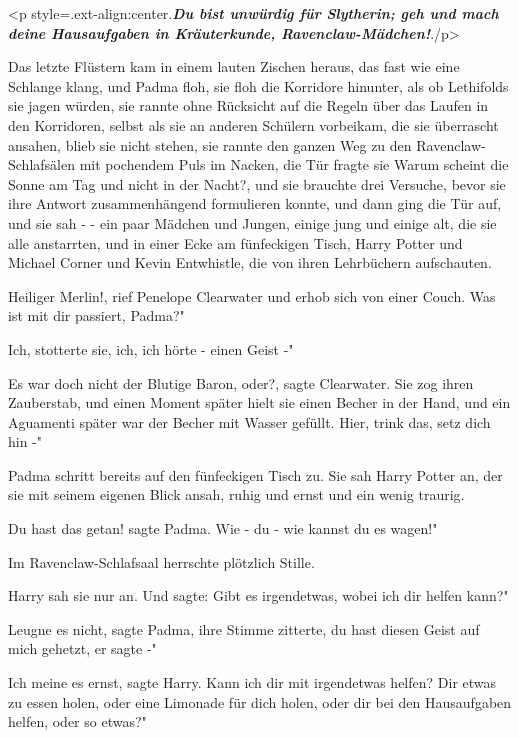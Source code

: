 <p style=\grqq{}.ext-align:center\grqq{}.\textbf{\emph{Du bist unwürdig für
Slytherin; geh und mach deine Hausaufgaben in Kräuterkunde,
Ravenclaw-Mädchen!}}\grqq{}./p>

Das letzte Flüstern kam in einem lauten Zischen heraus, das fast wie eine
Schlange klang, und Padma floh, sie floh die Korridore hinunter, als ob
Lethifolds sie jagen würden, sie rannte ohne Rücksicht auf die Regeln über das
Laufen in den Korridoren, selbst als sie an anderen Schülern vorbeikam, die sie
überrascht ansahen, blieb sie nicht stehen, sie rannte den ganzen Weg zu den
Ravenclaw-Schlafsälen mit pochendem Puls im Nacken, die Tür fragte sie \glqq
Warum scheint die Sonne am Tag und nicht in der Nacht?\grqq{}, und sie brauchte
drei Versuche, bevor sie ihre Antwort zusammenhängend formulieren konnte, und
dann ging die Tür auf, und sie sah - - ein paar Mädchen und Jungen, einige jung
und einige alt, die sie alle anstarrten, und in einer Ecke am fünfeckigen Tisch,
Harry Potter und Michael Corner und Kevin Entwhistle, die von ihren Lehrbüchern
aufschauten.

\glqq Heiliger Merlin!\grqq{}, rief Penelope Clearwater und erhob sich von einer
Couch. \glqq Was ist mit dir passiert, Padma?"

\glqq Ich\grqq{}, stotterte sie, \glqq ich, ich hörte - einen Geist -"

\glqq Es war doch nicht der Blutige Baron, oder?\grqq{}, sagte Clearwater. Sie
zog ihren Zauberstab, und einen Moment später hielt sie einen Becher in der
Hand, und ein Aguamenti später war der Becher mit Wasser gefüllt. \glqq Hier,
trink das, setz dich hin -"

Padma schritt bereits auf den fünfeckigen Tisch zu. Sie sah Harry Potter an, der
sie mit seinem eigenen Blick ansah, ruhig und ernst und ein wenig traurig.

\glqq Du hast das getan!\grqq{} sagte Padma. \glqq Wie - du - wie kannst du es
wagen!"

Im Ravenclaw-Schlafsaal herrschte plötzlich Stille.

Harry sah sie nur an. Und sagte: \glqq Gibt es irgendetwas, wobei ich dir helfen
kann?"

\glqq Leugne es nicht\grqq{}, sagte Padma, ihre Stimme zitterte, \glqq du hast
diesen Geist auf mich gehetzt, er sagte -"

\glqq Ich meine es ernst\grqq{}, sagte Harry. \glqq Kann ich dir mit irgendetwas
helfen? Dir etwas zu essen holen, oder eine Limonade für dich holen, oder dir
bei den Hausaufgaben helfen, oder so etwas?"

